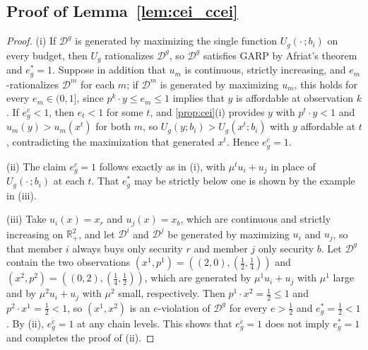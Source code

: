 \documentclass[11 pt]{article}
\begin{document}
\subsection{Proof of Lemma~\ref{lem:cei_ccei}}

\begin{proof}
(i) If $\mathcal{D}^{g}$ is generated by maximizing the single function $U_{g}(\cdot\,; b_{i})$ on every budget, then $U_{g}$ rationalizes $\mathcal{D}^{g}$, so $\mathcal{D}^{g}$ satisfies GARP by Afriat's theorem and $e^{*}_{g} = 1$. Suppose in addition that $u_{m}$ is continuous, strictly increasing, and $e_{m}$-rationalizes $\mathcal{D}^{m}$ for each $m$; if $\mathcal{D}^{m}$ is generated by maximizing $u_{m}$, this holds for every $e_{m} \in (0,1]$, since $p^{k} \cdot y \leq e_{m} \leq 1$ implies that $y$ is affordable at observation $k$. If $e^{c}_{g} < 1$, then $e_{t} < 1$ for some $t$, and \autoref{prop:cei}(i) provides $y$ with $p^{t} \cdot y < 1$ and $u_{m}(y) > u_{m}(x^{t})$ for both $m$, so $U_{g}(y; b_{i}) > U_{g}(x^{t}; b_{i})$ with $y$ affordable at $t$, contradicting the maximization that generated $x^{t}$. Hence $e^{c}_{g} = 1$.

(ii) The claim $e^{c}_{g} = 1$ follows exactly as in (i), with $\mu^{t} u_{i} + u_{j}$ in place of $U_{g}(\cdot\,; b_{i})$ at each $t$. That $e^{*}_{g}$ may be strictly below one is shown by the example in (iii).

(iii) Take $u_{i}(x) = x_{r}$ and $u_{j}(x) = x_{b}$, which are continuous and strictly increasing on $\mathbb{R}^{2}_{+}$, and let $\mathcal{D}^{i}$ and $\mathcal{D}^{j}$ be generated by maximizing $u_{i}$ and $u_{j}$, so that member $i$ always buys only security $r$ and member $j$ only security $b$. Let $\mathcal{D}^{g}$ contain the two observations $(x^{1}, p^{1}) = ((2, 0), (\tfrac{1}{2}, \tfrac{1}{4}))$ and $(x^{2}, p^{2}) = ((0, 2), (\tfrac{1}{4}, \tfrac{1}{2}))$, which are generated by $\mu^{1} u_{i} + u_{j}$ with $\mu^{1}$ large and by $\mu^{2} u_{i} + u_{j}$ with $\mu^{2}$ small, respectively. Then $p^{1} \cdot x^{2} = \tfrac{1}{2} \leq 1$ and $p^{2} \cdot x^{1} = \tfrac{1}{2} < 1$, so $(x^{1}, x^{2})$ is an $e$-violation of $\mathcal{D}^{g}$ for every $e > \tfrac{1}{2}$ and $e^{*}_{g} = \tfrac{1}{2} < 1$. By (ii), $e^{c}_{g} = 1$ at any chain levels. This shows that $e^{c}_{g} = 1$ does not imply $e^{*}_{g} = 1$ and completes the proof of (ii).


\end{proof}
\end{document}
